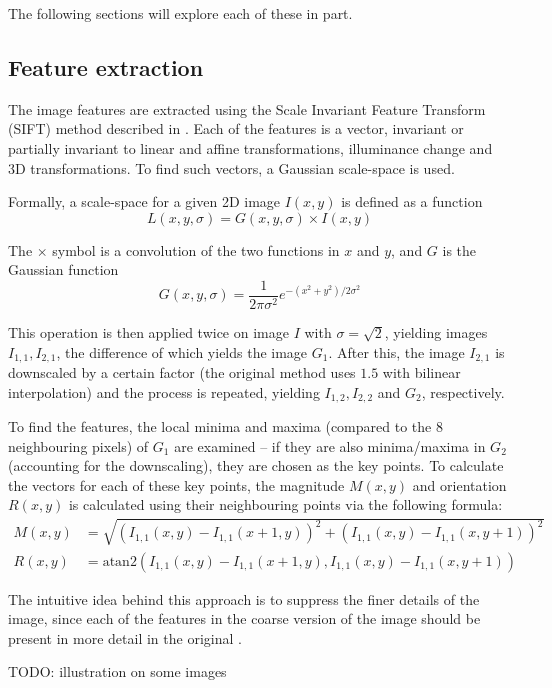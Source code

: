 The following sections will explore each of these in part.

\subsection{Feature extraction}
The image features are extracted using the Scale Invariant Feature Transform (SIFT) method described in \citet{lowe1999object,lowe2004distinctive,}.
Each of the features is a vector, invariant or partially invariant to linear and affine transformations, illuminance change and 3D transformations.
To find such vectors, a Gaussian scale-space is used.

Formally, a scale-space for a given 2D image $I(x, y)$ is defined as a function
$$L(x, y, \sigma) = G(x, y, \sigma) \times I(x, y)$$

The $\times$ symbol is a convolution of the two functions in $x$ and $y$, and $G$ is the Gaussian function
$$G(x, y, \sigma) = \frac{1}{2\pi \sigma^2} e^{-(x^2 + y^2) / 2\sigma^2}$$

This operation is then applied twice on image $I$ with $\sigma = \sqrt{2}$, yielding images $I_{1,1}, I_{2,1}$, the difference of which yields the image $G_1$.
After this, the image $I_{2,1}$ is downscaled by a certain factor (the original method uses $1.5$ with bilinear interpolation) and the process is repeated, yielding $I_{1,2}, I_{2,2}$ and $G_2$, respectively.

To find the features, the local minima and maxima (compared to the 8 neighbouring pixels) of $G_1$ are examined -- if they are also minima/maxima in $G_2$ (accounting for the downscaling), they are chosen as the key points.
To calculate the vectors for each of these key points, the magnitude $M(x,y)$ and orientation $R(x,y)$ is calculated using their neighbouring points via the following formula:
$$
\begin{aligned}
	M(x,y) &= \sqrt{\left(I_{1,1}(x, y) - I_{1,1}(x + 1, y)\right)^2 + \left(I_{1,1}(x,y) - I_{1,1}(x, y + 1)\right)^2} \\[0.7em]
	R(x,y) &= \mathrm{atan2} \left(I_{1,1}(x, y) - I_{1,1}(x + 1, y), I_{1,1}(x,y) - I_{1,1}(x, y + 1)\right)
\end{aligned}
$$

The intuitive idea behind this approach is to suppress the finer details of the image, since each of the features in the coarse version of the image should be present in more detail in the original \cite{scalespace}.

TODO: illustration on some images

